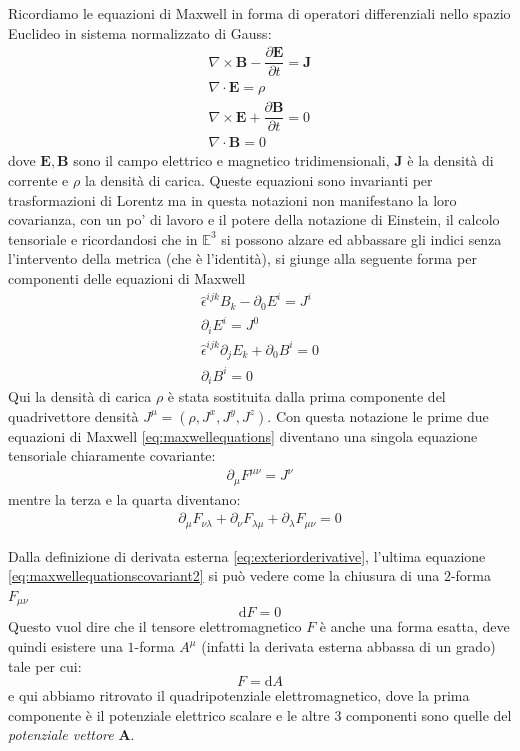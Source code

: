 \documentclass[twoside]{article}
\begin{document}
Ricordiamo le equazioni di Maxwell in forma di operatori differenziali nello spazio Euclideo in sistema normalizzato di Gauss:
\begin{align}\label{eq:maxwellequations}
	\nabla \times \mathbf{B} - \dfrac{\partial \mathbf{E}}{\partial t} = \mathbf{J} \nonumber \\
	\nabla \cdot \mathbf{E} = \rho  \nonumber \\ 
	\nabla \times \mathbf{E} + \dfrac{\partial \mathbf{B}}{\partial t} = 0 \nonumber \\
	\nabla \cdot \mathbf{B} = 0
\end{align}
dove $\mathbf{E},\mathbf{B}$ sono il campo elettrico e magnetico tridimensionali, $\mathbf{J}$ è la densità di corrente e $\rho$ la densità di carica. Queste equazioni sono invarianti per trasformazioni di Lorentz ma in questa notazioni non manifestano la loro covarianza, con un po' di lavoro e il potere della notazione di Einstein, il calcolo tensoriale e ricordandosi che in $\mathbb{E}^3$ si possono alzare ed abbassare gli indici senza l'intervento della metrica (che è l'identità), si giunge alla seguente forma per componenti delle equazioni di Maxwell
\begin{align}
	\hat{\epsilon}^{ijk}B_k - \partial_0 E^i = J^i \nonumber \\
	\partial_i E^i = J^0 \nonumber \\ 
	\hat{\epsilon}^{ijk} \partial_j E_k + \partial_0 B^i = 0 \nonumber \\
	\partial_i B^i = 0
\end{align} 
Qui la densità di carica $\rho$ è stata sostituita dalla prima componente del quadrivettore densità $J^\mu=(\rho,J^x,J^y,J^z)$. Con questa notazione le prime due equazioni di Maxwell \ref{eq:maxwellequations} diventano una singola equazione tensoriale chiaramente covariante:
\begin{align}\label{eq:maxwellequationscovariant1}
	\boxed{\partial_\mu F^{\mu \nu} = J^\nu}
\end{align}
mentre la terza e la quarta diventano:
\begin{align}\label{eq:maxwellequationscovariant2}
\boxed{\partial_\mu F_{\nu\lambda}+\partial_\nu F_{\lambda \mu}+\partial_\lambda F_{\mu \nu} = 0}
\end{align}

Dalla definizione di derivata esterna \ref{eq:exteriorderivative}, l'ultima equazione \ref{eq:maxwellequationscovariant2} si può vedere come la chiusura di una $2$-forma $F_{\mu \nu}$ 
\begin{equation}\label{eq:closureoff}
 \textrm{d}F=0	
\end{equation}
Questo vuol dire che il tensore elettromagnetico $F$ è anche una forma esatta, deve quindi esistere una $1$-forma $A^{\mu}$ (infatti la derivata esterna abbassa di un grado) tale per cui:
\begin{equation}\label{eq:electromagneticpotential}
	F = \textrm{d}A
\end{equation}
e qui abbiamo ritrovato il quadripotenziale elettromagnetico, dove la prima componente è il potenziale elettrico scalare e le altre 3 componenti sono quelle del \emph{potenziale vettore} $\mathbf{A}$.
\end{document}
